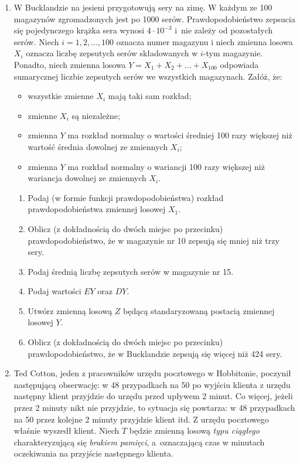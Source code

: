 \documentclass[twoside]{mwart}
\begin{document}
\begin{enumerate}
\item W Bucklandzie na jesieni przygotowują sery na zimę. W każdym ze 100 magazynów
zgromadzonych jest po 1000 serów. Prawdopodobieństwo zepsucia się pojedynczego
krążka sera wynosi $4\cdot 10^{-3}$ i~nie zależy od pozostałych serów. Niech
$i=1,2,\ldots,100$ oznacza numer magazynu i niech zmienna losowa $X_i$ oznacza
liczbę zepsutych serów składowanych w $i$-tym magazynie. Ponadto, niech zmienna
losowa $Y=X_1+X_2+\ldots+X_{100}$ odpowiada sumarycznej liczbie zepsutych serów
we wszystkich magazynach. Załóż, że:
\begin{itemize}
\item wszystkie zmienne $X_i$ mają taki sam rozkład;
\item zmienne $X_i$ są niezależne;
\item zmienna $Y$ ma rozkład normalny o wartości średniej 100 razy większej niż wartość średnia dowolnej ze zmiennych $X_i$;
\item zmienna $Y$ ma rozkład normalny o wariancji 100 razy większej niż wariancja dowolnej ze zmiennych $X_i$.
\end{itemize}

\begin{enumerate}
\item Podaj  (w formie funkcji prawdopodobieństwa) rozkład prawdopodobieństwa zmiennej losowej $X_1$.
\item Oblicz (z dokładnością do dwóch miejsc po przecinku) prawdopodobieństwo, że w magazynie nr 10 zepsują się mniej niż trzy sery.
\item Podaj średnią liczbę zepsutych serów w magazynie nr 15.
\item Podaj wartości $EY$ oraz $DY$.
\item Utwórz zmienną losową $Z$ będącą standaryzowaną postacią zmiennej losowej $Y$.
\item Oblicz (z dokładnością do dwóch miejsc po przecinku) prawdopodobieństwo, że w Bucklandzie zepsują się więcej niż 424 sery.
\end{enumerate}

\item Ted Cotton, jeden z pracowników urzędu pocztowego w Hobbitonie, poczynił następującą obserwację: w 48 przypadkach na 50 po wyjściu klienta z urzędu następny klient przyjdzie do urzędu przed upływem 2 minut.
Co więcej, jeżeli przez 2 minuty nikt nie przyjdzie, to sytuacja się powtarza: w 48 przypadkach na 50 przez kolejne 2 minuty przyjdzie klient itd.
Z urzędu pocztowego właśnie wyszedł klient.
Niech $T$ będzie zmienną losową \emph{typu ciągłego} charakteryzującą się \emph{brakiem pamięci}, a~oznaczającą czas w minutach oczekiwania na przyjście następnego klienta.


\end{enumerate}
\end{document}
